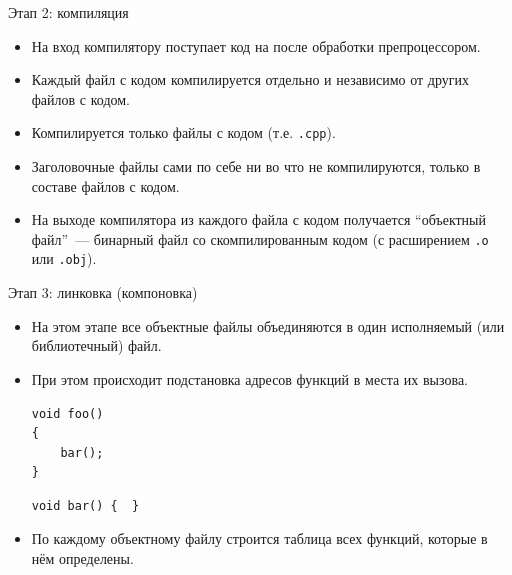 \documentclass[aspectration=1610,t]{beamer}
\begin{document}
\begin{frame}[fragile]{Этап 2: компиляция}
\begin{itemize}
    \item На вход компилятору поступает код на \langcpp после обработки
        препроцессором.
        
    \item Каждый файл с кодом компилируется отдельно и независимо от других
        файлов с кодом.
        
    \item Компилируется только файлы с кодом (т.е. {\tt *.cpp}).
        
    \item Заголовочные файлы сами по себе ни во что не компилируются, только в
        составе файлов с кодом.
        
    \item На выходе компилятора из каждого файла с кодом получается ``объектный
        файл''~--- бинарный файл со скомпилированным кодом (с расширением
        \texttt{.o} или \texttt{.obj}).

\end{itemize}
\end{frame}


\begin{frame}[fragile]{Этап 3: линковка (компоновка)}
\begin{itemize}
    \item На этом этапе все объектные файлы объединяются в один исполняемый 
        (или библиотечный) файл.

    \item При этом происходит подстановка адресов функций в места их вызова.
    \begin{lstlisting}
void foo()
{
    bar();
}
\end{lstlisting}

\begin{lstlisting}
void bar() {  }
\end{lstlisting}

    \item По каждому объектному файлу строится таблица всех
        функций, которые в нём определены.
\end{itemize}
\end{frame}
\end{document}
